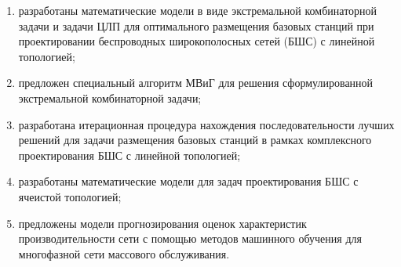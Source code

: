 \begin{enumerate}
  \item разработаны математические модели в виде экстремальной комбинаторной задачи и
  задачи ЦЛП для оптимального размещения базовых станций при
  проектировании беспроводных широкополосных сетей (БШС) с линейной топологией;
  \item предложен специальный алгоритм МВиГ для решения сформулированной
  экстремальной комбинаторной задачи;
  \item разработана итерационная процедура нахождения последовательности лучших
  решений для задачи размещения базовых станций в рамках комплексного
  проектирования БШС с линейной топологией;
  \item разработаны математические модели для задач проектирования БШС с ячеистой
  топологией;
  \item предложены модели прогнозирования оценок характеристик производительности сети с
  помощью методов машинного обучения для многофазной сети массового обслуживания.
\end{enumerate}

